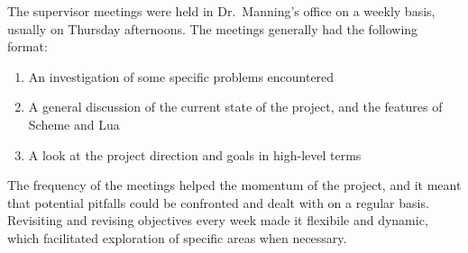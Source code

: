 The supervisor meetings were held in Dr.\ Manning's office on a weekly basis,
usually on Thursday afternoons. The meetings generally had the following format:

\begin{enumerate}
\item An investigation of some specific problems encountered
\item A general discussion of the current state of the project, and the
features of Scheme and Lua
\item A look at the project direction and goals in high-level terms
\end{enumerate}

The frequency of the meetings helped the momentum of the project, and it meant
that potential pitfalls could be confronted and dealt with on a regular basis.
Revisiting and revising objectives every week made it flexibile and dynamic,
which facilitated exploration of specific areas when necessary.


